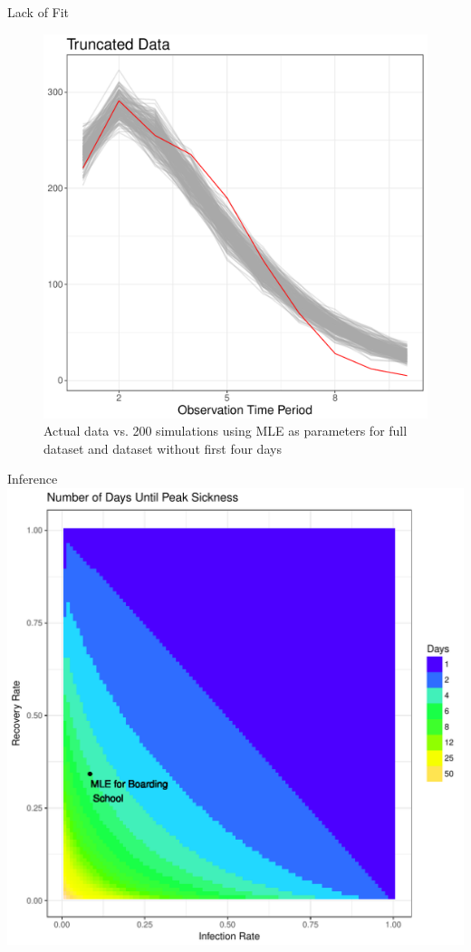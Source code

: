 \documentclass[10pt,table]{beamer}
\begin{document}
\begin{frame}{Lack of Fit}
\begin{figure}
\begin{minipage}{.4\textwidth}
\centering
\includegraphics[width=1\linewidth]{BetterFit.pdf}
\end{minipage}
\caption{Actual data vs. 200 simulations using MLE as parameters for full dataset and dataset without first four days}
\label{plot1}
\end{figure}

\end{frame}

\begin{frame}{Inference}
\centering
\includegraphics[scale=.45]{DayGrid.pdf}
\end{frame}
\end{document}
